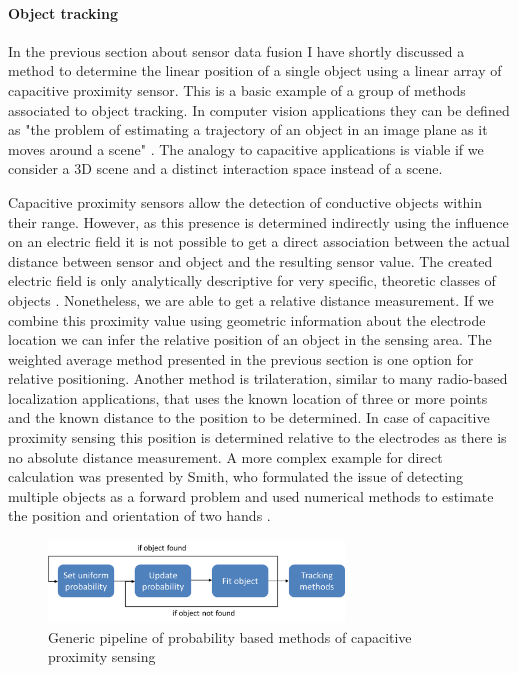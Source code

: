 \paragraph{Object tracking}
In the previous section about sensor data fusion I have shortly discussed a method to determine the linear position of a single object using a linear array of capacitive proximity sensor. This is a basic example of a group of methods associated to object tracking. In computer vision applications they can be defined as "the problem of estimating a trajectory of an object in an image plane as it moves around a scene" \cite{yilmaz2006object}. The analogy to capacitive applications is viable if we consider a 3D scene and a distinct interaction space instead of a scene. 

Capacitive proximity sensors allow the detection of conductive objects within their range. However, as this presence is determined indirectly using the influence on an electric field it is not possible to get a direct association between the actual distance between sensor and object and the resulting sensor value. The created electric field is only analytically descriptive for very specific, theoretic classes of objects \cite{Baxter1996}. Nonetheless, we are able to get a relative distance measurement. If we combine this proximity value using geometric information about the electrode location we can infer the relative position of an object in the sensing area. The weighted average method presented in the previous section is one option for relative positioning. Another method is trilateration, similar to many radio-based localization applications, that uses the known location of three or more points and the known distance to the position to be determined. In case of capacitive proximity sensing this position is determined relative to the electrodes as there is no absolute distance measurement. 
A more complex example for direct calculation was presented by Smith, who formulated the issue of detecting multiple objects as a forward problem and used numerical methods to estimate the position and orientation of two hands \cite{smith1999thesis}.
\begin{figure}[h]
\centering
\includegraphics[width=0.7\textwidth]{images/prob_methods}
\caption{Generic pipeline of probability based methods of capacitive proximity sensing}
\label{fig:rel_prob_method}
\end{figure}
